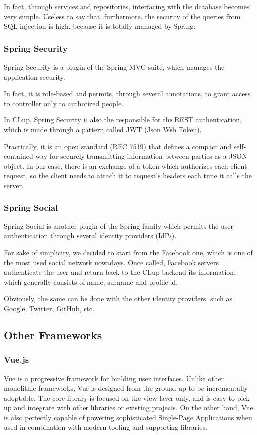 \documentclass[table, 12pt]{article}
\begin{document}
In fact, through services and repositories, interfacing with the database becomes very simple. Useless to say that, furthermore, the security of the queries from SQL injection is high, because it is totally managed by Spring.

\subsubsection{Spring Security}
Spring Security is a plugin of the Spring MVC suite, which manages the application security.

In fact, it is role-based and permits, through several annotations, to grant access to controller only to authorized people.

In CLup, Spring Security is also the responsible for the REST authentication, which is made through a pattern called JWT (Json Web Token).

Practically, it is an open standard (RFC 7519) that defines a compact and self-contained way for securely transmitting information between parties as a JSON object.
In our case, there is an exchange of a token which authorizes each client request, so the client needs to attach it to request's headers each time it calls the server.
\subsubsection{Spring Social}
Spring Social is another plugin of the Spring family which permits the user authentication through several identity providers (IdPs).

For sake of simplicity, we decided to start from the Facebook one, which is one of the most used social network nowadays. Once called, Facebook servers authenticate the user and return back to the CLup backend its information, which generally consists of name, surname and profile id.

Obviously, the same can be done with the other identity providers, such as Google, Twitter, GitHub, etc.

\subsection{Other Frameworks}
\label{client_side_frameworks}
\subsubsection{Vue.js}
Vue is a progressive framework for building user interfaces. Unlike other monolithic frameworks, Vue is designed from the ground up to be incrementally adoptable. The core library is focused on the view layer only, and is easy to pick up and integrate with other libraries or existing projects. On the other hand, Vue is also perfectly capable of powering sophisticated Single-Page Applications when used in combination with modern tooling and supporting libraries.
\end{document}
